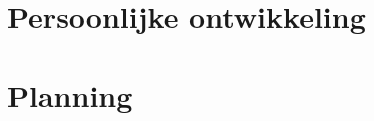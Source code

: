 \documentclass[a4paper,11pt,oneside]{report}
\begin{document}
\chapter{Persoonlijke ontwikkeling}
\lipsum[1]

\chapter{Planning}
  \label{chap:planning}


\newpage

\printglossary


\renewcommand{\bibname}{Bronvermeldingen}



\nocite{*}

\end{document}
